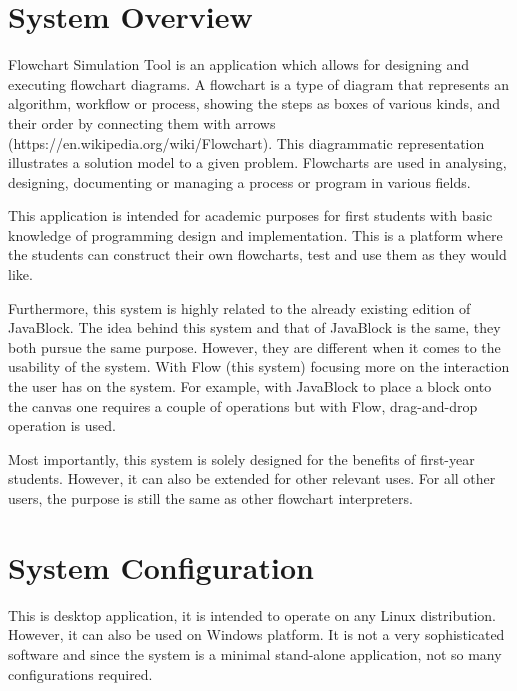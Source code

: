 \documentclass[11pt,a4paper,titlepage]{article}
\begin{document}

\newpage
\tableofcontents
{}
\newpage
{}
\section{System Overview}
	
		Flowchart Simulation Tool is an application which allows for designing and executing flowchart diagrams. A flowchart is a type of diagram that represents an algorithm, workflow or process, showing the steps as boxes of various kinds, and their order by connecting them with arrows (https://en.wikipedia.org/wiki/Flowchart). This diagrammatic representation illustrates a solution model to a given problem. Flowcharts are used in analysing, designing, documenting or managing a process or program in various fields. \newline
		
		This application is intended for academic purposes for first students with basic knowledge of programming design and implementation. This is a platform where the students can construct their own flowcharts, test and use them as they would like. \newline
		
		Furthermore, this system is highly related to the already existing edition of JavaBlock. The idea behind this system and that of JavaBlock is the same, they both pursue the same purpose. However, they are different when it comes to the usability of the system. With Flow (this system) focusing more on the interaction the user has on the system. For example, with JavaBlock to place a block onto the canvas one requires a couple of operations but with Flow, drag-and-drop operation is used.\newline
		
		Most importantly, this system is solely designed for the benefits of first-year students. However, it can also be extended for other relevant uses. For all other users, the purpose is still the same as other flowchart interpreters.
		
\section{System Configuration}
		
		This is desktop application, it is intended to operate on any Linux distribution. However, it can also be used on Windows platform. It is not a very sophisticated software and since the system is a minimal stand-alone application, not so many configurations required. \newline
		
\end{document}
